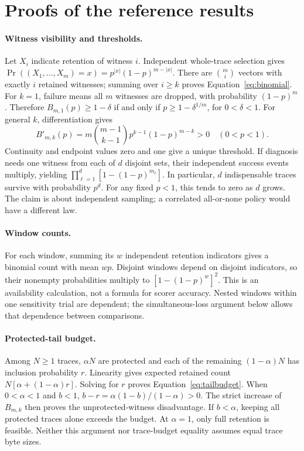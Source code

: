 \section{Proofs of the reference results}\label{app:formal}
\paragraph{Witness visibility and thresholds.}
Let $X_i$ indicate retention of witness $i$. Independent whole-trace selection gives
$\Pr((X_1,\ldots,X_m)=x)=p^{|x|}(1-p)^{m-|x|}$.
There are $\binom mi$ vectors with exactly $i$ retained witnesses; summing over $i\ge k$ proves Equation~\eqref{eq:binomial}. For $k=1$, failure means all $m$ witnesses are dropped, with probability $(1-p)^m$. Therefore
$B_{m,1}(p)\ge1-\delta$ if and only if $p\ge1-\delta^{1/m}$, for $0<\delta<1$. For general $k$, differentiation gives
\[
 B'_{m,k}(p)=m\binom{m-1}{k-1}p^{k-1}(1-p)^{m-k}>0
 \quad(0<p<1).
\]
Continuity and endpoint values zero and one give a unique threshold. If diagnosis needs one witness from each of $d$ disjoint sets, their independent success events multiply, yielding $\prod_{\ell=1}^{d}[1-(1-p)^{m_\ell}]$. In particular, $d$ indispensable traces survive with probability $p^d$. For any fixed $p<1$, this tends to zero as $d$ grows. The claim is about independent sampling; a correlated all-or-none policy would have a different law.

\paragraph{Window counts.}
For each window, summing its $w$ independent retention indicators gives a binomial count with mean $wp$. Disjoint windows depend on disjoint indicators, so their nonempty probabilities multiply to $[1-(1-p)^w]^2$. This is an availability calculation, not a formula for scorer accuracy. Nested windows within one sensitivity trial are dependent; the simultaneous-loss argument below allows that dependence between comparisons.

\paragraph{Protected-tail budget.}
Among $N\ge1$ traces, $\alpha N$ are protected and each of the remaining $(1-\alpha)N$ has inclusion probability $r$. Linearity gives expected retained count $N[\alpha+(1-\alpha)r]$. Solving for $r$ proves Equation~\eqref{eq:tailbudget}. When $0<\alpha<1$ and $b<1$, $b-r=\alpha(1-b)/(1-\alpha)>0$. The strict increase of $B_{m,k}$ then proves the unprotected-witness disadvantage. If $b<\alpha$, keeping all protected traces alone exceeds the budget. At $\alpha=1$, only full retention is feasible. Neither this argument nor trace-budget equality assumes equal trace byte sizes.

